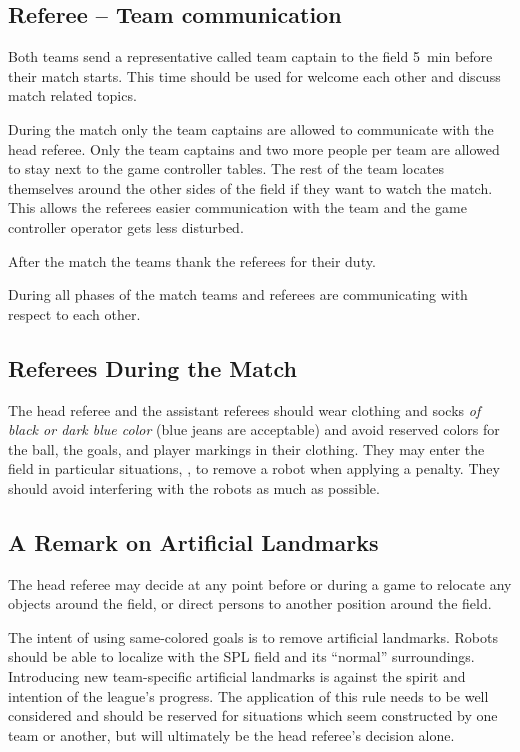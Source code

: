 \subsection{Referee -- Team communication}
\label{sec:referee_team_communiation}
Both teams send a representative called team captain to the field \qty{5}{\minute} before their match starts. This time should be used for welcome each other and discuss match related topics.

During the match only the team captains are allowed to communicate with the head referee. Only the team captains and two more people per team are allowed to stay next to the game controller tables. The rest of the team locates themselves around the other sides of the field if they want to watch the match. This allows the referees easier communication with the team and the game controller operator gets less disturbed.

After the match the teams thank the referees for their duty. 

During all phases of the match teams and referees are communicating with respect to each other.

\subsection{Referees During the Match}

The head referee and the assistant referees should wear clothing and socks \emph{of black or dark blue color} (blue jeans are acceptable) and avoid reserved colors for the ball, the goals, and player markings in their clothing. They may enter the field in particular situations, \eg, to remove a robot when applying a penalty. They should avoid interfering with the robots as much as possible.

\subsection{A Remark on Artificial Landmarks}
\label{sec:judgment:landmarks}

The head referee may decide at any point before or during a game to relocate any objects around the field, or direct persons to another position around the field.

The intent of using same-colored goals is to remove artificial landmarks.
Robots should be able to localize with the SPL field and its ``normal'' surroundings.
Introducing new team-specific artificial landmarks is against the spirit and intention of the league's progress.
The application of this rule needs to be well considered and should be reserved for situations which seem constructed by one team or another, but will ultimately be the head referee's decision alone.
